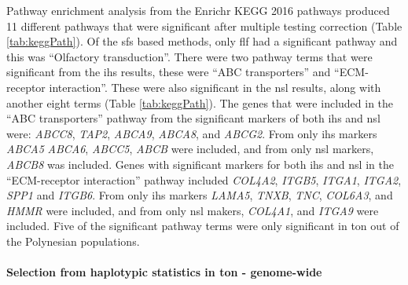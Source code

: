 \documentclass[twoside,openright]{report}
\let\oldparagraph\paragraph
\renewcommand{\paragraph}[1]{\oldparagraph{#1}\mbox{}}
\begin{document}
Pathway enrichment analysis from the Enrichr KEGG 2016 pathways produced
11 different pathways that were significant after multiple testing
correction (Table \ref{tab:keggPath}). Of the \gls{sfs} based methods,
only \gls{flf} had a significant pathway and this was ``Olfactory
transduction''. There were two pathway terms that were significant from
the \gls{ihs} results, these were ``ABC transporters'' and
``ECM-receptor interaction''. These were also significant in the
\gls{nsl} results, along with another eight terms (Table
\ref{tab:keggPath}). The genes that were included in the ``ABC
transporters'' pathway from the significant markers of both \gls{ihs}
and \gls{nsl} were: \emph{ABCC8}, \emph{TAP2}, \emph{ABCA9},
\emph{ABCA8}, and \emph{ABCG2}. From only \gls{ihs} markers \emph{ABCA5}
\emph{ABCA6}, \emph{ABCC5}, \emph{ABCB} were included, and from only
\gls{nsl} markers, \emph{ABCB8} was included. Genes with significant
markers for both \gls{ihs} and \gls{nsl} in the ``ECM-receptor
interaction'' pathway included \emph{COL4A2}, \emph{ITGB5},
\emph{ITGA1}, \emph{ITGA2}, \emph{SPP1} and \emph{ITGB6}. From only
\gls{ihs} markers \emph{LAMA5}, \emph{TNXB}, \emph{TNC}, \emph{COL6A3},
and \emph{HMMR} were included, and from only \gls{nsl} makers,
\emph{COL4A1}, and \emph{ITGA9} were included. Five of the significant
pathway terms were only significant in \gls{ton} out of the Polynesian
populations.

\paragraph{\texorpdfstring{Selection from haplotypic statistics in
\gls{ton} -
genome-wide}{Selection from haplotypic statistics in  - genome-wide}}\label{selection-from-haplotypic-statistics-in---genome-wide-2}
\end{document}
